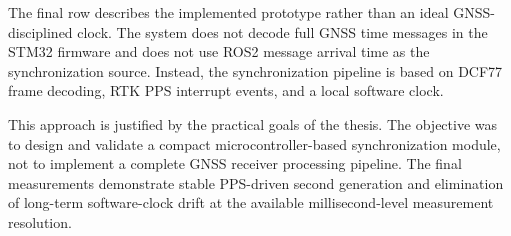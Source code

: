 The final row describes the implemented prototype rather than an ideal GNSS-disciplined clock. The system does not decode full GNSS time messages in the STM32 firmware and does not use ROS2 message arrival time as the synchronization source. Instead, the synchronization pipeline is based on DCF77 frame decoding, RTK PPS interrupt events, and a local software clock.

This approach is justified by the practical goals of the thesis. The objective was to design and validate a compact microcontroller-based synchronization module, not to implement a complete GNSS receiver processing pipeline. The final measurements demonstrate stable PPS-driven second generation and elimination of long-term software-clock drift at the available millisecond-level measurement resolution.
